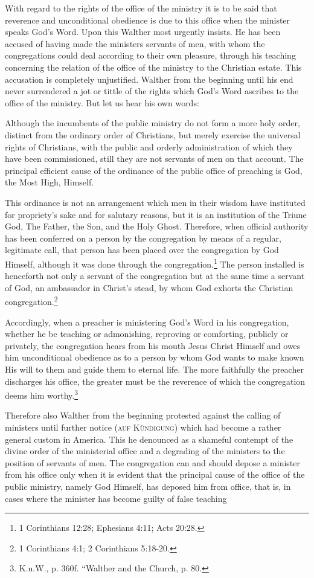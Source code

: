                 With regard to the rights of the office of the ministry it is to be said that reverence and unconditional obedience is due to this office when the minister speaks God’s Word.  Upon this Walther most urgently insists.  He has been accused of having made the ministers servants of men, with whom the congregations could deal according to their own pleasure, through his teaching concerning the relation of the office of the ministry to the Christian estate.  This accusation is completely unjustified.  Walther from the beginning until his end never surrendered a jot or tittle of the rights which God’s Word ascribes to the office of the ministry.  But let us hear his own words: \begin{fancyquotes}Although the incumbents of the public ministry do not form a more holy order, distinct from the ordinary order of Christians, but merely exercise the universal rights of Christians, with the public and orderly administration of which they have been commissioned, still they are not servants of men on that account.  The principal efficient cause of the ordinance of the public office of preaching is God, the Most High, Himself.\par  This ordinance is not an arrangement which men in their wisdom have instituted for propriety’s sake and for salutary reasons, but it is an institution of the Triune God, The Father, the Son, and the Holy Ghost.  Therefore, when official authority has been conferred on a person by the congregation by means of a regular, legitimate call, that person has been placed over the congregation by God Himself, although it was done through the congregation.\footnote{1 Corinthians 12:28; Ephesians 4:11; Acts 20:28.}  The person installed is henceforth not only a servant of the congregation but at the same time a servant of God, an ambassador in Christ’s stead, by whom God exhorts the Christian congregation.\footnote{1 Corinthians 4:1; 2 Corinthians 5:18-20.} \par Accordingly, when a preacher is ministering God’s Word in his congregation, whether he be teaching or admonishing, reproving or comforting, publicly or privately, the congregation hears from his mouth Jesus Christ Himself and owes him unconditional obedience as to a person by whom God wants to make known His will to them and guide them to eternal life.  The more faithfully the preacher discharges his office, the greater must be the reverence of which the congregation deems him worthy.\footnote{K.u.W., p. 360f. “Walther and the Church, p. 80.}\end{fancyquotes}  Therefore also Walther from the beginning protested against the calling of ministers until further notice {\scriptsize\textsc{(auf Kündigung)}} which had become a rather general custom in America.  This he denounced as a shameful contempt of the divine order of the ministerial office and a degrading of the ministers to the position of servants of men.  The congregation can and should depose a minister from his office only when it is evident that the principal cause of the office of the public ministry, namely God Himself, has deposed him from office, that is, in cases where the minister has become guilty of false teaching 
